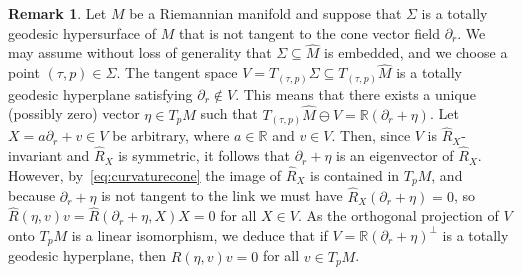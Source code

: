 \documentclass[11pt,a4paper,final]{amsart}
\newcommand{\R}{\mathbb{R}}
\renewcommand{\hat}{\widehat}
\theoremstyle{definition}
\newtheorem{remark}[theorem]{Remark}
\begin{document}
\begin{remark}\label{remark:SkewCones}
	Let $M$ be a Riemannian manifold and suppose that $\Sigma$ is a totally geodesic hypersurface of $M$ that is not tangent to the cone vector field $\partial_{r}$.
	We may assume without loss of generality that $\Sigma\subseteq \hat{M}$ is embedded, and we choose a point $(\tau,p)\in \Sigma$.
	The tangent space $V=T_{(\tau,p)}\Sigma\subseteq T_{(\tau,p)}\hat{M}$ is a totally geodesic hyperplane satisfying $\partial_{r}\notin V$.
	This means that there exists a unique (possibly zero) vector $\eta\in T_{p}M$ such that $T_{(\tau,p)}\hat{M}\ominus V=\R (\partial_{r}+\eta)$.
	Let $X=a\partial_{r}+v\in V$ be arbitrary, where $a\in \R$ and $v\in V$.
	Then, since $V$ is $\hat{R}_{X}$-invariant and $\hat{R}_{X}$ is symmetric, it follows that $\partial_{r}+\eta$ is an eigenvector of $\hat{R}_{X}$.
	However, by~\eqref{eq:curvaturecone} the image of $\hat{R}_{X}$ is contained in $T_{p}M$, and because $\partial_{r}+\eta$ is not tangent to the link we must have $\hat{R}_{X}(\partial_{r}+\eta)=0$, so $\hat{R}(\eta,v)v=\hat{R}(\partial_{r}+\eta,X)X=0$	for all $X\in V$.
	As the orthogonal projection of $V$ onto $T_{p}M$ is a linear isomorphism, we deduce that if $V=\R(\partial_{r}+\eta)^{\perp}$ is a totally geodesic hyperplane, then $\hat{R}(\eta,v)v=0$ for all $v\in T_{p}M$.
\end{remark}
\end{document}
